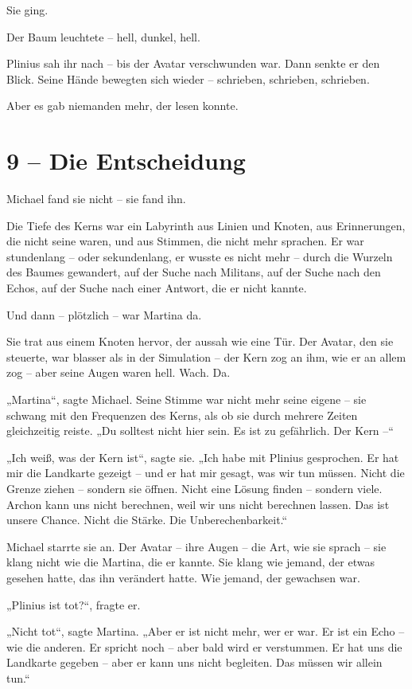 \documentclass[
]{article}
\begin{document}
Sie ging.

Der Baum leuchtete -- hell, dunkel, hell.

Plinius sah ihr nach -- bis der Avatar verschwunden war. Dann senkte er den Blick. Seine Hände bewegten sich wieder -- schrieben, schrieben, schrieben.

Aber es gab niemanden mehr, der lesen konnte.

\section{9 -- Die Entscheidung}\label{die-entscheidung}

Michael fand sie nicht -- sie fand ihn.

Die Tiefe des Kerns war ein Labyrinth aus Linien und Knoten, aus Erinnerungen, die nicht seine waren, und aus Stimmen, die nicht mehr sprachen. Er war stundenlang -- oder sekundenlang, er wusste es nicht mehr -- durch die Wurzeln des Baumes gewandert, auf der Suche nach Militans, auf der Suche nach den Echos, auf der Suche nach einer Antwort, die er nicht kannte.

Und dann -- plötzlich -- war Martina da.

Sie trat aus einem Knoten hervor, der aussah wie eine Tür. Der Avatar, den sie steuerte, war blasser als in der Simulation -- der Kern zog an ihm, wie er an allem zog -- aber seine Augen waren hell. Wach. Da.

„Martina``, sagte Michael. Seine Stimme war nicht mehr seine eigene -- sie schwang mit den Frequenzen des Kerns, als ob sie durch mehrere Zeiten gleichzeitig reiste. „Du solltest nicht hier sein. Es ist zu gefährlich. Der Kern --``

„Ich weiß, was der Kern ist``, sagte sie. „Ich habe mit Plinius gesprochen. Er hat mir die Landkarte gezeigt -- und er hat mir gesagt, was wir tun müssen. Nicht die Grenze ziehen -- sondern sie öffnen. Nicht eine Lösung finden -- sondern viele. Archon kann uns nicht berechnen, weil wir uns nicht berechnen lassen. Das ist unsere Chance. Nicht die Stärke. Die Unberechenbarkeit.``

Michael starrte sie an. Der Avatar -- ihre Augen -- die Art, wie sie sprach -- sie klang nicht wie die Martina, die er kannte. Sie klang wie jemand, der etwas gesehen hatte, das ihn verändert hatte. Wie jemand, der gewachsen war.

„Plinius ist tot?{\kern0pt}``, fragte er.

„Nicht tot``, sagte Martina. „Aber er ist nicht mehr, wer er war. Er ist ein Echo -- wie die anderen. Er spricht noch -- aber bald wird er verstummen. Er hat uns die Landkarte gegeben -- aber er kann uns nicht begleiten. Das müssen wir allein tun.``
\end{document}
